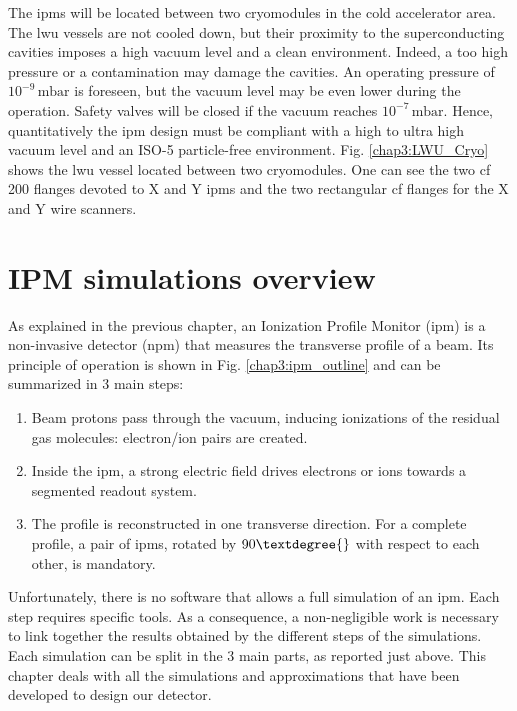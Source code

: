 \begin{refsection}
  The \acrshort{ipm}s will be located between two cryomodules in the cold accelerator area. The \acrshort{lwu} vessels are not cooled down, but their proximity to the superconducting cavities imposes a high vacuum level and a clean environment. Indeed, a too high pressure or a contamination may damage the cavities. An operating pressure of \(10^{-9}\,\mathrm{mbar}\) is foreseen, but the vacuum level may be even lower during the operation. Safety valves will be closed if the vacuum reaches \(10^{-7}\,\mathrm{mbar}\). Hence, quantitatively the \acrshort{ipm} design must be compliant with a high to ultra high vacuum level and an ISO-5 \cite{ISO14644} particle-free environment. Fig. \ref{chap3:LWU_Cryo} shows the \acrshort{lwu} vessel located between two cryomodules. One can see the two \acrshort{cf} 200 flanges devoted to X and Y \acrshort{ipm}s and the two rectangular \acrshort{cf} flanges for the X and Y wire scanners.

  \section{IPM simulations overview}

  

  As explained in the previous chapter, an Ionization Profile Monitor (\acrshort{ipm}) is a non-invasive detector (\acrshort{npm}) that measures the transverse profile of a beam.
  Its principle of operation is shown in Fig. \ref{chap3:ipm_outline} and can be summarized in 3 main steps:
  \begin{enumerate}
    \item Beam protons pass through the vacuum, inducing ionizations of the residual gas molecules: electron/ion pairs are created.
    \item Inside the \acrshort{ipm}, a strong electric field drives electrons or ions towards a segmented readout system.
    \item The profile is reconstructed in one transverse direction. For a complete profile, a pair of \acrshort{ipm}s, rotated by $90\textdegree{}$ with respect to each other, is mandatory.
  \end{enumerate}

  Unfortunately, there is no software that allows a full simulation of an \acrshort{ipm}. Each step requires specific tools. As a consequence, a non-negligible work is necessary to link together the results obtained by the different steps of the simulations. Each simulation can be split in the 3 main parts, as reported just above. This chapter deals with all the simulations and approximations that have been developed to design our detector.


\end{refsection}
